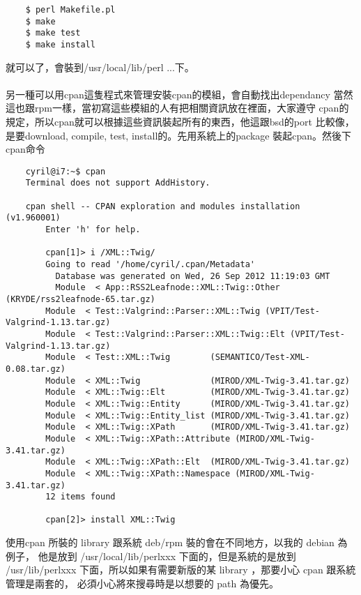     \begin{verbatim}
    $ perl Makefile.pl
    $ make
    $ make test
    $ make install
    \end{verbatim}
    就可以了，會裝到/usr/local/lib/perl ...下。
    \\\\
    另一種可以用cpan這隻程式來管理安裝cpan的模組，會自動找出dependancy
    當然這也跟rpm一樣，當初寫這些模組的人有把相關資訊放在裡面，大家遵守
    cpan的規定，所以cpan就可以根據這些資訊裝起所有的東西，他這跟bsd的port
    比較像，是要download, compile, test, install的。先用系統上的package
    裝起cpan。然後下cpan命令
    {\scriptsize
    \begin{verbatim}
    cyril@i7:~$ cpan 
    Terminal does not support AddHistory.

    cpan shell -- CPAN exploration and modules installation (v1.960001)
        Enter 'h' for help.

        cpan[1]> i /XML::Twig/
        Going to read '/home/cyril/.cpan/Metadata'
          Database was generated on Wed, 26 Sep 2012 11:19:03 GMT
          Module  < App::RSS2Leafnode::XML::Twig::Other (KRYDE/rss2leafnode-65.tar.gz)
        Module  < Test::Valgrind::Parser::XML::Twig (VPIT/Test-Valgrind-1.13.tar.gz)
        Module  < Test::Valgrind::Parser::XML::Twig::Elt (VPIT/Test-Valgrind-1.13.tar.gz)
        Module  < Test::XML::Twig        (SEMANTICO/Test-XML-0.08.tar.gz)
        Module  < XML::Twig              (MIROD/XML-Twig-3.41.tar.gz)
        Module  < XML::Twig::Elt         (MIROD/XML-Twig-3.41.tar.gz)
        Module  < XML::Twig::Entity      (MIROD/XML-Twig-3.41.tar.gz)
        Module  < XML::Twig::Entity_list (MIROD/XML-Twig-3.41.tar.gz)
        Module  < XML::Twig::XPath       (MIROD/XML-Twig-3.41.tar.gz)
        Module  < XML::Twig::XPath::Attribute (MIROD/XML-Twig-3.41.tar.gz)
        Module  < XML::Twig::XPath::Elt  (MIROD/XML-Twig-3.41.tar.gz)
        Module  < XML::Twig::XPath::Namespace (MIROD/XML-Twig-3.41.tar.gz)
        12 items found

        cpan[2]> install XML::Twig
    \end{verbatim}
    }
    使用cpan 所裝的 library 跟系統 deb/rpm 裝的會在不同地方，以我的 debian 為例子，
    他是放到 /usr/local/lib/perlxxx 下面的，但是系統的是放到 /usr/lib/perlxxx
    下面，所以如果有需要新版的某 library ，那要小心 cpan 跟系統管理是兩套的，
    必須小心將來搜尋時是以想要的 path 為優先。

